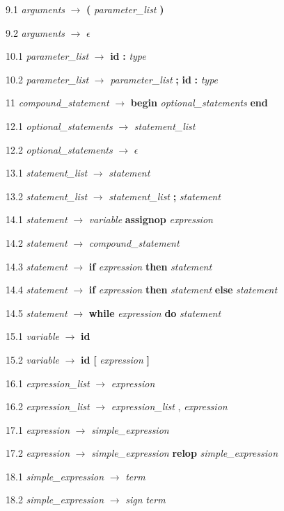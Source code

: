 9.1  \emph{arguments} $\rightarrow$ \textbf{(} \emph{parameter\_list} \textbf{)}

9.2  \emph{arguments} $\rightarrow$ $\epsilon$

10.1 \emph{parameter\_list} $\rightarrow$ \textbf{id} \textbf{:} \emph{type}

10.2 \emph{parameter\_list} $\rightarrow$ \emph{parameter\_list} \textbf{;} \textbf{id} \textbf{:} \emph{type}

11   \emph{compound\_statement} $\rightarrow$ \textbf{begin} \emph{optional\_statements} \textbf{end}

12.1 \emph{optional\_statements} $\rightarrow$ \emph{statement\_list}

12.2 \emph{optional\_statements} $\rightarrow$ $\epsilon$

13.1 \emph{statement\_list} $\rightarrow$ \emph{statement}

13.2 \emph{statement\_list} $\rightarrow$ \emph{statement\_list} \textbf{;} \emph{statement}

14.1 \emph{statement} $\rightarrow$ \emph{variable} \textbf{assignop} \emph{expression}

14.2 \emph{statement} $\rightarrow$ \emph{compound\_statement}

14.3 \emph{statement} $\rightarrow$ \textbf{if} \emph{expression} \textbf{then} \emph{statement}

14.4 \emph{statement} $\rightarrow$ \textbf{if} \emph{expression} \textbf{then} \emph{statement} \textbf{else} \emph{statement}

14.5 \emph{statement} $\rightarrow$ \textbf{while} \emph{expression} \textbf{do} \emph{statement}

15.1 \emph{variable} $\rightarrow$ \textbf{id}

15.2 \emph{variable} $\rightarrow$ \textbf{id} \textbf{[} \emph{expression} \textbf{]}

16.1 \emph{expression\_list} $\rightarrow$ \emph{expression}

16.2 \emph{expression\_list} $\rightarrow$ \emph{expression\_list} , \emph{expression}

17.1 \emph{expression} $\rightarrow$ \emph{simple\_expression}

17.2 \emph{expression} $\rightarrow$ \emph{simple\_expression} \textbf{relop} \emph{simple\_expression}

18.1 \emph{simple\_expression} $\rightarrow$ \emph{term}

18.2 \emph{simple\_expression} $\rightarrow$ \emph{sign} \emph{term}

